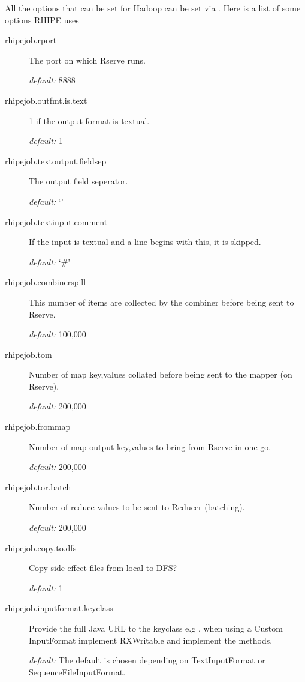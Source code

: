 \documentclass[letterpaper,10pt,english]{manual}
\begin{document}
All the options that can be set for Hadoop can be set via
. Here is a list of some options RHIPE uses
\begin{description}
\item[rhipejob.rport]
The port on which Rserve runs.

\emph{default:} 8888

\item[rhipejob.outfmt.is.text]
1 if the output format is textual.

\emph{default:} 1

\item[rhipejob.textoutput.fieldsep]
The output field seperator.

\emph{default:} `'

\item[rhipejob.textinput.comment]
If the input is textual and a line begins with this, it is skipped.

\emph{default:} `\#'

\item[rhipejob.combinerspill]
This number of items are collected by the combiner before being sent to Rserve.

\emph{default:} 100,000

\item[rhipejob.tom]
Number of map key,values collated before being sent to the mapper (on Rserve).

\emph{default:} 200,000

\item[rhipejob.frommap]
Number of map output key,values to bring from Rserve in one go.

\emph{default:} 200,000

\item[rhipejob.tor.batch]
Number of reduce values to be sent to Reducer (batching).

\emph{default:} 200,000

\item[rhipejob.copy.to.dfs]
Copy side effect files from local to DFS?

\emph{default:} 1

\item[rhipejob.inputformat.keyclass]
Provide the full Java URL to the keyclass e.g , when using a Custom InputFormat implement RXWritable and implement the methods.

\emph{default:} The default is chosen depending on TextInputFormat or SequenceFileInputFormat.


\end{description}
\end{document}
